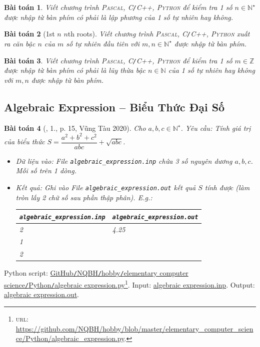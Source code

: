 \documentclass{article}
\newtheorem{baitoan}{Bài toán}
\begin{document}
\begin{baitoan}
	Viết chương trình \textsc{Pascal, C\texttt{/}C++, Python} để kiểm tra 1 số $n\in\mathbb{N}^\star$ được nhập từ bàn phím có phải là lập phương của 1 số tự nhiên hay không.
\end{baitoan}

\begin{baitoan}[1st $n$ $n$th roots]
	Viết chương trình \textsc{Pascal, C\texttt{/}C++, Python} xuất ra căn bậc $n$ của $m$ số tự nhiên đầu tiên với $m,n\in\mathbb{N}^\star$ được nhập từ bàn phím.
\end{baitoan}

\begin{baitoan}
	Viết chương trình \textsc{Pascal, C\texttt{/}C++, Python} để kiểm tra 1 số $m\in\mathbb{Z}$ được nhập từ bàn phím có phải là lũy thừa bậc $n\in\mathbb{N}$ của 1 số tự nhiên hay không với $m,n$ được nhập từ bàn phím.
\end{baitoan}


\subsection{Algebraic Expression -- Biểu Thức Đại Số}

\begin{baitoan}[\cite{VietSTEM2021}, 1., p. 15, Vũng Tàu 2020]
	Cho $a,b,c\in\mathbb{N}^\star$. {\sf Yêu cầu:} Tính giá trị của biểu thức $S = \dfrac{a^2 + b^2 + c^2}{abc} + \sqrt{abc}$.
	\begin{itemize}
		\item {\sf Dữ liệu vào:} File \verb|algebraic_expression.inp| chứa 3 số nguyên dương $a,b,c$. Mỗi số trên 1 dòng.
		\item {\sf Kết quả:} Ghi vào File \verb|algebraic_expression.out| kết quả $S$ tính được (làm tròn lấy 2 chữ số sau phần thập phân). E.g.:
		\begin{table}[H]
			\centering
			\begin{tabular}{|l|l|}
				\hline
				\verb|algebraic_expression.inp| & \verb|algebraic_expression.out| \\
				\hline
				2 & 4.25 \\
				1 &  \\
				2 &  \\
				\hline
			\end{tabular}
		\end{table}
	\end{itemize}
\end{baitoan}
Python script: \href{https://github.com/NQBH/hobby/blob/master/elementary_computer_science/Python/algebraic_expression.py}{GitHub\texttt{/}NQBH\texttt{/}hobby\texttt{/}elementary computer science\texttt{/}Python\texttt{/}algebraic expression.py}\footnote{\textsc{url}: \url{https://github.com/NQBH/hobby/blob/master/elementary_computer_science/Python/algebraic_expression.py}.}. Input: \href{https://github.com/NQBH/hobby/blob/master/elementary_computer_science/Python/algebraic_expression.inp}{algebraic expression.inp}. Output: \href{https://github.com/NQBH/hobby/blob/master/elementary_computer_science/Python/algebraic_expression.out}{algebraic expression.out}.
\end{document}

